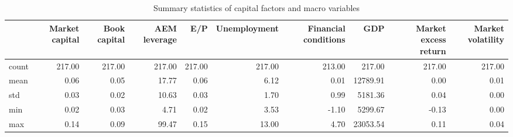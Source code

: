\begin{table}
\caption{Summary statistics of capital factors and macro variables}
\label{tab:Table 2.1}
\begin{tabular}{lrrrrrrrrr}
\toprule
 & Market capital & Book capital & AEM leverage & E/P & Unemployment & Financial conditions & GDP & Market excess return & Market volatility \\
\midrule
count & 217.00 & 217.00 & 217.00 & 217.00 & 217.00 & 213.00 & 217.00 & 217.00 & 217.00 \\
mean & 0.06 & 0.05 & 17.77 & 0.06 & 6.12 & 0.01 & 12789.91 & 0.00 & 0.01 \\
std & 0.03 & 0.02 & 10.63 & 0.03 & 1.70 & 0.99 & 5181.36 & 0.04 & 0.00 \\
min & 0.02 & 0.03 & 4.71 & 0.02 & 3.53 & -1.10 & 5299.67 & -0.13 & 0.00 \\
max & 0.14 & 0.09 & 99.47 & 0.15 & 13.00 & 4.70 & 23053.54 & 0.11 & 0.04 \\
\bottomrule
\end{tabular}
\end{table}
